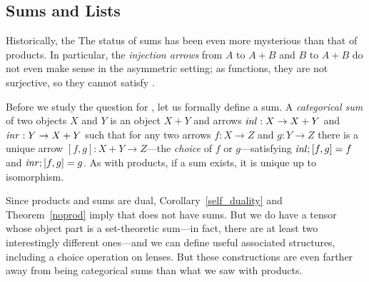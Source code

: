 \begin{defn}[$R$-similarity]
\begin{theorem}
\begin{lemma}
\begin{theorem}[No products]
\section{Sums and Lists}\label{sumlist}

\iffull Historically, the \else The \fi status of sums has been even more
mysterious than
that of products.  In particular, the {\em injection arrows} from $A$ to $A
+ B$ and $B$ to $A + B$ do not even make sense in the asymmetric setting; as
functions, they are not surjective, so they cannot satisfy .

\iffull
Before we study the question for \LENS{}, let us formally define a sum.
\fi
%
A \emph{categorical sum} of two objects $X$ and $Y$ is an object $X+Y$ and
arrows $\mathit{inl} : X \to X+Y$ and $\mathit{inr} : Y \to X+Y$ such that for any two
arrows $f : X \to Z$ and $g : Y \to Z$ there is a unique arrow $[f,g] : X +
Y \to Z$---the \emph{choice} of $f$ or $g$---satisfying $\mathit{inl};[f,g] = f$
and $\mathit{inr};[f,g] = g$. As with products, if a sum exists, it is unique up to
isomorphism.

Since products and sums are dual, Corollary~\ref{self_duality} and
Theorem~\ref{noprod} imply that \LENS{} does not have sums.
But we do have a tensor whose object part is a set-theoretic
sum---in fact, there are at least two interestingly different ones---and we
can define useful associated structures, including 
a choice operation on lenses.  \iffull But these constructions are
even farther away from being categorical sums than what we saw with
products.


\end{theorem}
\end{lemma}
\end{theorem}
\end{defn}
